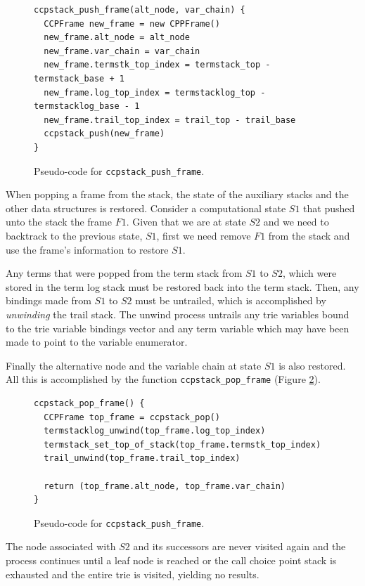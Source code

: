 \begin{figure}[ht]
\begin{Verbatim}[fontsize=\small]
ccpstack_push_frame(alt_node, var_chain) {
  CCPFrame new_frame = new CPPFrame()
  new_frame.alt_node = alt_node
  new_frame.var_chain = var_chain
  new_frame.termstk_top_index = termstack_top - termstack_base + 1
  new_frame.log_top_index = termstacklog_top - termstacklog_base - 1
  new_frame.trail_top_index = trail_top - trail_base
  ccpstack_push(new_frame)
}
\end{Verbatim}
\caption{Pseudo-code for \texttt{ccpstack\_push\_frame}.}
\label{fig:ccpstack_push_frame}
\end{figure}

When popping a frame from the stack, the state of the auxiliary stacks and the other data
structures is restored. Consider a computational state $S1$ that pushed unto the stack
the frame $F1$. Given that we are at state $S2$ and we need to backtrack to the previous state, $S1$,
first we need remove $F1$ from the stack and use the frame's information to restore $S1$.

Any terms that were popped from the term stack from $S1$ to $S2$, which were
stored in the term log stack must be restored back into the term stack.
Then, any bindings made from $S1$ to $S2$ must be untrailed, which is
accomplished by \textit{unwinding} the trail stack. The unwind process untrails
any trie variables bound to the trie variable bindings vector
and any term variable which may have been made to point to the variable enumerator. 

Finally the alternative node and
the variable chain at state $S1$ is also restored. All this is accomplished by the
function \texttt{ccpstack\_pop\_frame} (Figure \ref{fig:ccpstack_pop_frame}).

\begin{figure}[ht]
\begin{Verbatim}[fontsize=\small]
ccpstack_pop_frame() {
  CCPFrame top_frame = ccpstack_pop()
  termstacklog_unwind(top_frame.log_top_index)
  termstack_set_top_of_stack(top_frame.termstk_top_index)
  trail_unwind(top_frame.trail_top_index)
  
  return (top_frame.alt_node, top_frame.var_chain)
}
\end{Verbatim}
\caption{Pseudo-code for \texttt{ccpstack\_push\_frame}.}
\label{fig:ccpstack_pop_frame}
\end{figure}

The node associated with $S2$ and its successors are never visited again and
the process continues until a leaf node is reached or the call choice point stack
is exhausted and the entire trie is visited, yielding no results.

